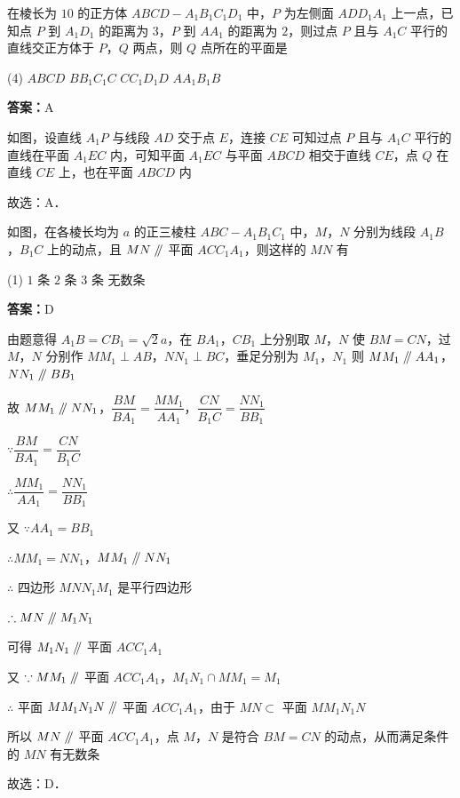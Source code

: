 \begin{example}[\bkstar{3}{5}]
在棱长为 $10$ 的正方体 $ABCD-A_1B_1C_1D_1$ 中，$P$ 为左侧面 $ADD_1A_1$ 上一点，已知点 $P$ 到 $A_1D_1$ 的距离为 $3$，$P$ 到 $AA_1$ 的距离为 $2$，则过点 $P$ 且与 $A_1C$ 平行的直线交正方体于 $P$，$Q$ 两点，则 $Q$ 点所在的平面是
\begin{tasks}(4)
    \task $ABCD$
    \task $BB_1C_1C$
    \task $CC_1D_1D$
    \task $AA_1B_1B$
\end{tasks}
\end{example}
\begin{solution}
\textbf{答案：}A

如图，设直线 $A_1P$ 与线段 $AD$ 交于点 $E$，连接 $CE$
可知过点 $P$ 且与 $A_1C$ 平行的直线在平面 $A_1EC$ 内，可知平面 $A_1EC$ 与平面 $ABCD$ 相交于直线 $CE$，点 $Q$ 在直线 $CE$ 上，也在平面 $ABCD$ 内

故选：A．
\end{solution}

\vspace{2em}


\begin{example}[\bkstar{3}{5}]
如图，在各棱长均为 $a$ 的正三棱柱 $ABC-A_1B_1C_1$ 中，$M$，$N$ 分别为线段 $A_1B$，$B_1C$ 上的动点，且 $MN\mathrel{/\mkern-5mu/}$ 平面 $ACC_1A_1$，则这样的 $MN$ 有
\begin{tasks}(1)
    \task $1$ 条
    \task $2$ 条
    \task $3$ 条
    \task 无数条
\end{tasks}
\end{example}
\begin{solution}
\textbf{答案：}D

由题意得 $A_1B=CB_1=\sqrt{2}a$，在 $BA_1$，$CB_1$ 上分别取 $M$，$N$ 使 $BM=CN$，过 $M$，$N$ 分别作 $MM_1\perp AB$，$NN_1\perp BC$，垂足分别为 $M_1$，$N_1$
则 $MM_1\mathrel{/\mkern-5mu/} AA_1$，$NN_1\mathrel{/\mkern-5mu/} BB_1$

故 $MM_1\mathrel{/\mkern-5mu/} NN_1$，$\dfrac{BM}{BA_1}=\dfrac{MM_1}{AA_1}$，$\dfrac{CN}{B_1C}=\dfrac{NN_1}{BB_1}$

$\because \dfrac{BM}{BA_1}=\dfrac{CN}{B_1C}$

$\therefore \dfrac{MM_1}{AA_1}=\dfrac{NN_1}{BB_1}$

又 $\because AA_1=BB_1$

$\therefore MM_1=NN_1$，$MM_1\mathrel{/\mkern-5mu/} NN_1$

$\therefore$ 四边形 $MNN_1M_1$ 是平行四边形

$\therefore MN\mathrel{/\mkern-5mu/} M_1N_1$

可得 $M_1N_1\mathrel{/\mkern-5mu/}$ 平面 $ACC_1A_1$

又 $\because MM_1\mathrel{/\mkern-5mu/}$ 平面 $ACC_1A_1$，$M_1N_1\cap MM_1=M_1$

$\therefore$ 平面 $MM_1N_1N\mathrel{/\mkern-5mu/}$ 平面 $ACC_1A_1$，由于 $MN\subset$ 平面 $MM_1N_1N$

所以 $MN\mathrel{/\mkern-5mu/}$ 平面 $ACC_1A_1$，点 $M$，$N$ 是符合 $BM=CN$ 的动点，从而满足条件的 $MN$ 有无数条

故选：D．
\end{solution}

